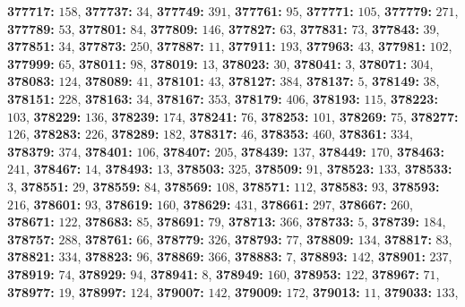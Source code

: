 \textsf{\bfseries 377717:} $158$, \textsf{\bfseries 377737:} $34$, \textsf{\bfseries 377749:} $391$, \textsf{\bfseries 377761:} $95$, \textsf{\bfseries 377771:} $105$, \textsf{\bfseries 377779:} $271$, \textsf{\bfseries 377789:} $53$, \textsf{\bfseries 377801:} $84$, \textsf{\bfseries 377809:} $146$, \textsf{\bfseries 377827:} $63$, \textsf{\bfseries 377831:} $73$, \textsf{\bfseries 377843:} $39$, \textsf{\bfseries 377851:} $34$, \textsf{\bfseries 377873:} $250$, \textsf{\bfseries 377887:} $11$, \textsf{\bfseries 377911:} $193$, \textsf{\bfseries 377963:} $43$, \textsf{\bfseries 377981:} $102$, \textsf{\bfseries 377999:} $65$, \textsf{\bfseries 378011:} $98$, \textsf{\bfseries 378019:} $13$, \textsf{\bfseries 378023:} $30$, \textsf{\bfseries 378041:} $3$, \textsf{\bfseries 378071:} $304$, \textsf{\bfseries 378083:} $124$, \textsf{\bfseries 378089:} $41$, \textsf{\bfseries 378101:} $43$, \textsf{\bfseries 378127:} $384$, \textsf{\bfseries 378137:} $5$, \textsf{\bfseries 378149:} $38$, \textsf{\bfseries 378151:} $228$, \textsf{\bfseries 378163:} $34$, \textsf{\bfseries 378167:} $353$, \textsf{\bfseries 378179:} $406$, \textsf{\bfseries 378193:} $115$, \textsf{\bfseries 378223:} $103$, \textsf{\bfseries 378229:} $136$, \textsf{\bfseries 378239:} $174$, \textsf{\bfseries 378241:} $76$, \textsf{\bfseries 378253:} $101$, \textsf{\bfseries 378269:} $75$, \textsf{\bfseries 378277:} $126$, \textsf{\bfseries 378283:} $226$, \textsf{\bfseries 378289:} $182$, \textsf{\bfseries 378317:} $46$, \textsf{\bfseries 378353:} $460$, \textsf{\bfseries 378361:} $334$, \textsf{\bfseries 378379:} $374$, \textsf{\bfseries 378401:} $106$, \textsf{\bfseries 378407:} $205$, \textsf{\bfseries 378439:} $137$, \textsf{\bfseries 378449:} $170$, \textsf{\bfseries 378463:} $241$, \textsf{\bfseries 378467:} $14$, \textsf{\bfseries 378493:} $13$, \textsf{\bfseries 378503:} $325$, \textsf{\bfseries 378509:} $91$, \textsf{\bfseries 378523:} $133$, \textsf{\bfseries 378533:} $3$, \textsf{\bfseries 378551:} $29$, \textsf{\bfseries 378559:} $84$, \textsf{\bfseries 378569:} $108$, \textsf{\bfseries 378571:} $112$, \textsf{\bfseries 378583:} $93$, \textsf{\bfseries 378593:} $216$, \textsf{\bfseries 378601:} $93$, \textsf{\bfseries 378619:} $160$, \textsf{\bfseries 378629:} $431$, \textsf{\bfseries 378661:} $297$, \textsf{\bfseries 378667:} $260$, \textsf{\bfseries 378671:} $122$, \textsf{\bfseries 378683:} $85$, \textsf{\bfseries 378691:} $79$, \textsf{\bfseries 378713:} $366$, \textsf{\bfseries 378733:} $5$, \textsf{\bfseries 378739:} $184$, \textsf{\bfseries 378757:} $288$, \textsf{\bfseries 378761:} $66$, \textsf{\bfseries 378779:} $326$, \textsf{\bfseries 378793:} $77$, \textsf{\bfseries 378809:} $134$, \textsf{\bfseries 378817:} $83$, \textsf{\bfseries 378821:} $334$, \textsf{\bfseries 378823:} $96$, \textsf{\bfseries 378869:} $366$, \textsf{\bfseries 378883:} $7$, \textsf{\bfseries 378893:} $142$, \textsf{\bfseries 378901:} $237$, \textsf{\bfseries 378919:} $74$, \textsf{\bfseries 378929:} $94$, \textsf{\bfseries 378941:} $8$, \textsf{\bfseries 378949:} $160$, \textsf{\bfseries 378953:} $122$, \textsf{\bfseries 378967:} $71$, \textsf{\bfseries 378977:} $19$, \textsf{\bfseries 378997:} $124$, \textsf{\bfseries 379007:} $142$, \textsf{\bfseries 379009:} $172$, \textsf{\bfseries 379013:} $11$, \textsf{\bfseries 379033:} $133$, 
